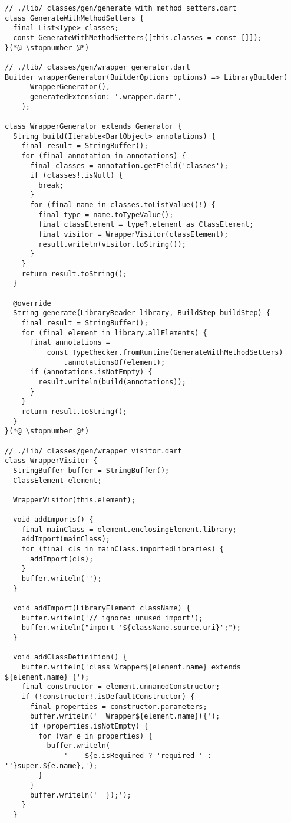 \begin{lstlisting}
// ./lib/_classes/gen/generate_with_method_setters.dart
class GenerateWithMethodSetters {
  final List<Type> classes;
  const GenerateWithMethodSetters([this.classes = const []]);
}(*@ \stopnumber @*)

// ./lib/_classes/gen/wrapper_generator.dart
Builder wrapperGenerator(BuilderOptions options) => LibraryBuilder(
      WrapperGenerator(),
      generatedExtension: '.wrapper.dart',
    );

class WrapperGenerator extends Generator {
  String build(Iterable<DartObject> annotations) {
    final result = StringBuffer();
    for (final annotation in annotations) {
      final classes = annotation.getField('classes');
      if (classes!.isNull) {
        break;
      }
      for (final name in classes.toListValue()!) {
        final type = name.toTypeValue();
        final classElement = type?.element as ClassElement;
        final visitor = WrapperVisitor(classElement);
        result.writeln(visitor.toString());
      }
    }
    return result.toString();
  }

  @override
  String generate(LibraryReader library, BuildStep buildStep) {
    final result = StringBuffer();
    for (final element in library.allElements) {
      final annotations =
          const TypeChecker.fromRuntime(GenerateWithMethodSetters)
              .annotationsOf(element);
      if (annotations.isNotEmpty) {
        result.writeln(build(annotations));
      }
    }
    return result.toString();
  }
}(*@ \stopnumber @*)
  
// ./lib/_classes/gen/wrapper_visitor.dart
class WrapperVisitor {
  StringBuffer buffer = StringBuffer();
  ClassElement element;

  WrapperVisitor(this.element);

  void addImports() {
    final mainClass = element.enclosingElement.library;
    addImport(mainClass);
    for (final cls in mainClass.importedLibraries) {
      addImport(cls);
    }
    buffer.writeln('');
  }

  void addImport(LibraryElement className) {
    buffer.writeln('// ignore: unused_import');
    buffer.writeln("import '${className.source.uri}';");
  }

  void addClassDefinition() {
    buffer.writeln('class Wrapper${element.name} extends ${element.name} {');
    final constructor = element.unnamedConstructor;
    if (!constructor!.isDefaultConstructor) {
      final properties = constructor.parameters;
      buffer.writeln('  Wrapper${element.name}({');
      if (properties.isNotEmpty) {
        for (var e in properties) {
          buffer.writeln(
              '    ${e.isRequired ? 'required ' : ''}super.${e.name},');
        }
      }
      buffer.writeln('  });');
    }
  }


\end{lstlisting}
